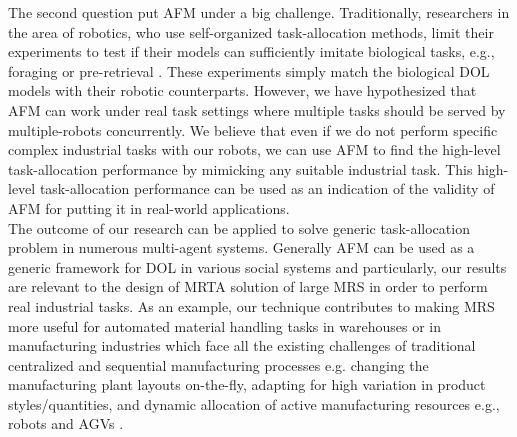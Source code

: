 The second question put AFM under a big challenge. Traditionally, researchers in the area of robotics, who use self-organized task-allocation methods, limit their experiments to test  if their models can sufficiently imitate biological tasks, e.g., foraging \cite{Krieger+2000} or pre-retrieval \cite{Labella2007}. These experiments simply match the biological DOL models with their robotic counterparts. However, we have hypothesized that AFM can work under real task settings where multiple tasks  should be served by multiple-robots concurrently. We believe that even if we do not perform specific complex industrial tasks with our robots, we can use AFM to find the high-level task-allocation performance by mimicking any suitable industrial task. This  high-level task-allocation performance can be used as an indication of the validity of AFM for putting it in real-world applications.\\
The outcome of our research can be applied to solve generic task-allocation problem in numerous multi-agent systems. Generally AFM can be used as a generic framework for DOL in various social systems and particularly, our results are relevant to the design of MRTA solution of large MRS in order to perform real industrial tasks. As an example, our technique contributes to making MRS more useful for automated material handling tasks in warehouses or in manufacturing  industries which face all the existing challenges of traditional centralized and sequential manufacturing processes e.g. changing the manufacturing plant layouts on-the-fly, adapting for high variation in product styles/quantities, and dynamic allocation of active manufacturing resources e.g., robots and \acfp{AGV} \cite{Shen+2006}.
% 
